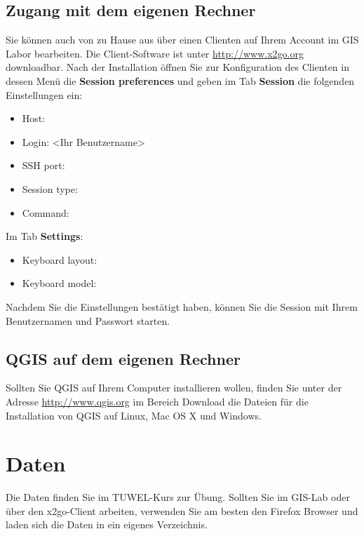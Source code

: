 \documentclass[a4paper,12pt,ngerman]{sphinxmanual}
\begin{document}
\subsection{Zugang mit dem eigenen Rechner}
\label{uebung2:zugang-mit-dem-eigenen-rechner}
Sie können auch von zu Hause aus über einen Clienten auf Ihrem Account im GIS Labor bearbeiten. Die Client-Software ist unter \href{http://www.x2go.org}{http://www.x2go.org} downloadbar.
Nach der Installation öffnen Sie zur Konfiguration des Clienten in dessen Menü die \textbf{Session preferences} und geben im Tab \textbf{Session} die folgenden Einstellungen ein:
\begin{itemize}
\item {} 
Host: 

\item {} 
Login: \textless{}Ihr Benutzername\textgreater{}

\item {} 
SSH port: 

\item {} 
Session type: 

\item {} 
Command: 

\end{itemize}

Im Tab \textbf{Settings}:
\begin{itemize}
\item {} 
Keyboard layout: 

\item {} 
Keyboard model: 

\end{itemize}

Nachdem Sie die Einstellungen bestätigt haben, können Sie die Session mit Ihrem Benutzernamen und Passwort starten.


\subsection{QGIS auf dem eigenen Rechner}
\label{uebung2:qgis-auf-dem-eigenen-rechner}
Sollten Sie QGIS auf Ihrem Computer installieren wollen, finden Sie unter der Adresse \href{http://www.qgis.org}{http://www.qgis.org} im Bereich Download die Dateien für die Installation von QGIS auf Linux, Mac OS X und Windows.


\section{Daten}
\label{uebung2:daten}
Die Daten finden Sie im TUWEL-Kurs zur Übung. Sollten Sie im GIS-Lab oder über den x2go-Client arbeiten, verwenden Sie am besten den Firefox Browser und laden sich die Daten in ein eigenes Verzeichnis.
\end{document}
